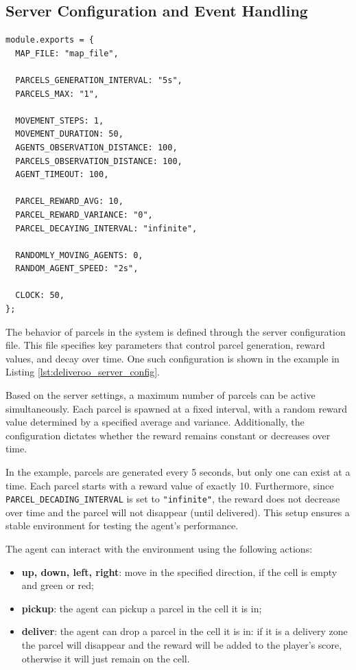 \subsection{Server Configuration and Event Handling}
\vspace{10mm}
\begin{codewindow}
    \begin{lstlisting}
module.exports = {
  MAP_FILE: "map_file",

  PARCELS_GENERATION_INTERVAL: "5s",
  PARCELS_MAX: "1",

  MOVEMENT_STEPS: 1,
  MOVEMENT_DURATION: 50,
  AGENTS_OBSERVATION_DISTANCE: 100,
  PARCELS_OBSERVATION_DISTANCE: 100,
  AGENT_TIMEOUT: 100,

  PARCEL_REWARD_AVG: 10,
  PARCEL_REWARD_VARIANCE: "0",
  PARCEL_DECAYING_INTERVAL: "infinite",

  RANDOMLY_MOVING_AGENTS: 0,
  RANDOM_AGENT_SPEED: "2s",

  CLOCK: 50,
};
\end{lstlisting}
\end{codewindow}
\vspace{10mm}
The behavior of parcels in the system is defined through the server
configuration file. This file specifies key parameters that control parcel generation,
reward values, and decay over time. One such configuration is shown in the
example in Listing \ref{lst:deliveroo_server_config}.

Based on the server settings, a maximum number of parcels can be active simultaneously.
Each parcel is spawned at a fixed interval, with a random reward value determined
by a specified average and variance. Additionally, the configuration dictates whether
the reward remains constant or decreases over time.

In the example, parcels are generated every 5 seconds, but only one can exist at
a time. Each parcel starts with a reward value of exactly 10. Furthermore, since
\texttt{PARCEL\_DECADING\_INTERVAL} is set to \texttt{"infinite"}, the reward
does not decrease over time and the parcel will not disappear (until delivered).
This setup ensures a stable environment for testing the agent's performance.

The agent can interact with the environment using the following actions:
\begin{itemize}
  \item \textbf{up, down, left, right}: move in the specified direction, if the
    cell is empty and green or red;

  \item \textbf{pickup}: the agent can pickup a parcel in the cell it is in;

  \item \textbf{deliver}: the agent can drop a parcel in the cell it is in: if
    it is a delivery zone the parcel will disappear and the reward will be added
    to the player's score, otherwise it will just remain on the cell.
\end{itemize}

